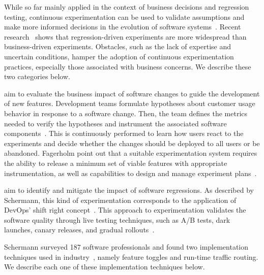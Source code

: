 While so far mainly applied in the context of business decisions and regression testing, continuous experimentation can be used to validate assumptions and make more informed decisions in the evolution of software systems~\cite{fagerholm-2014-building,fagerholm-2017-right}. Recent research~\cite{schermann-2018-continuous} shows that regression-driven experiments are more widespread than business-driven experiments. Obstacles, such as the lack of expertise and uncertain conditions, hamper the adoption of continuous experimentation practices, especially those associated with business concerns. We describe these two categories below.

\begin{description}[style=unboxed,leftmargin=0pt,font=\normalsize\bfseries]
	\item[Business-driven experiments] aim to evaluate the business impact of software changes to guide the development of new features. Development teams formulate hypotheses about customer usage behavior in response to a software change. Then, the team defines the metrics needed to verify the hypotheses and instrument the associated software components~\cite{kevic-2017-characterizing}. This is continuously performed to learn how users react to the experiments and decide whether the changes should be deployed to all users or be abandoned. Fagerholm \etal{} point out that a suitable experimentation system requires the ability to release a minimum set of viable features with appropriate instrumentation, as well as capabilities to design and manage experiment plans~\cite{fagerholm-2014-building}.
	
	\item[Regression-driven experiments] aim to identify and mitigate the impact of software regressions. As described by Schermann, this kind of experimentation corresponds to the application of DevOps' shift right concept~\cite{kaulgud-2016-shiting}. This approach to experimentation validates the software quality through live testing techniques, such as A/B tests, dark launches, canary releases, and gradual rollouts~\cite{schermann-2016-bifrost}.
\end{description}

Schermann \etal{} surveyed 187 software professionals and found two implementation techniques used in industry~\cite{schermann-2018-live}, namely feature toggles and run-time traffic routing. We describe each one of these implementation techniques below.

